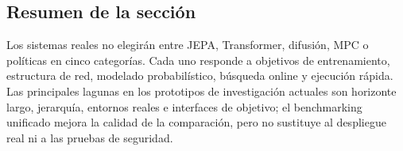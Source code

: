 \subsection{Resumen de la sección}

Los sistemas reales no elegirán entre JEPA, Transformer, difusión, MPC o políticas en cinco categorías. Cada uno responde a objetivos de entrenamiento, estructura de red, modelado probabilístico, búsqueda online y ejecución rápida. Las principales lagunas en los prototipos de investigación actuales son horizonte largo, jerarquía, entornos reales e interfaces de objetivo; el benchmarking unificado mejora la calidad de la comparación, pero no sustituye al despliegue real ni a las pruebas de seguridad.
